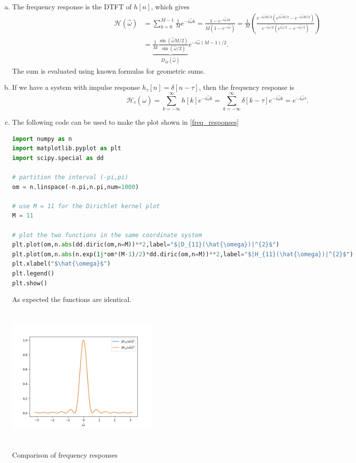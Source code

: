 \begin{enumerate}
\begin{enumerate}[a)]
\item The frequency response is the DTFT of $h[n]$, which gives
\begin{align*}
    \mathcal{H}(\hat{\omega})&=\sum_{k=0}^{M-1}\frac{1}{M}e^{-i\hat{\omega}k}=\frac{1-e^{-i\hat{\omega}M}}{M(1-e^{-i\hat{\omega}})}=\frac{1}{M}\left(\frac{e^{-i\hat{\omega}M/2}(e^{i\hat{\omega}M/2}-e^{-i\hat{\omega}M/2})}{e^{-i\hat{\omega}/2}(e^{i\hat{\omega}/2}-e^{-i\hat{\omega}/2})}\right) \\
    &=\underbrace{\frac{1}{M}\frac{\sin(\hat{\omega}M/2)}{\sin(\hat{\omega}/2)}}_{D_{M}(\hat{\omega})}e^{-i\hat{\omega}(M-1)/2}.
\end{align*}
The sum is evaluated using known formulas for geometric sums. 

\item If we have a system with impulse response $h_{\tau}[n]=\delta[n-\tau]$, then the frequency response is
$$\mathcal{H}_{\tau}(\hat{\omega})=\sum_{k=-\infty}^{\infty}h[k]e^{-i\hat{\omega}k}=\sum_{k=-\infty}^{\infty}\delta[k-\tau]e^{-i\hat{\omega}k}=e^{-i\hat{\omega}\tau}.$$

\item The following code can be used to make the plot shown in \ref{freq_responses}
\begin{lstlisting}[language=Python, caption=Plotting the frequency response code,label=code14_2]
import numpy as n
import matplotlib.pyplot as plt
import scipy.special as dd

# partition the interval (-pi,pi)
om = n.linspace(-n.pi,n.pi,num=1000)

# use M = 11 for the Dirichlet kernel plot
M = 11

# plot the two functions in the same coordinate system
plt.plot(om,n.abs(dd.diric(om,n=M))**2,label="$|D_{11}(\hat{\omega})|^{2}$")
plt.plot(om,n.abs(n.exp(1j*om*(M-1)/2)*dd.diric(om,n=M))**2,label="$|H_{11}(\hat{\omega})|^{2}$")
plt.xlabel("$\hat{\omega}$")
plt.legend()
plt.show()
\end{lstlisting}
As expected the functions are identical. 
\begin{marginfigure}
    \includegraphics[height=7.0cm,width=7.5cm]{ch11/figures/frequency_responses.png}
    \caption{Comparison of frequency responses}
    \label{freq_responses}
\end{marginfigure}


\end{enumerate}
\end{enumerate}
